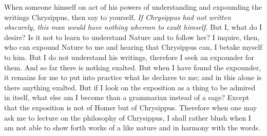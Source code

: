 When someone himself  on act of his powers of  understanding and expounding the
writings Chrysippus, then say to  yourself, \emph{If Chrysippus had not written
obscurely, this man  would have nothing whereon to exalt  himself.} But I, what
do I  desire? Is  it not to  learn to  understand Nature and  to follow  her? I
inquire, then, who can expound Nature to  me and hearing that Chrysippus can, I
betake myself to him. But I do not understand his writings, therefore I seek an
expounder for them. And so far there  is nothing exalted. But when I have found
the expounder, it remains  for me to put into practice what  he declares to me;
and in this alone is there anything exalted. But if I look on the exposition as
a  thing to  be admired  in itself,  what else  am I  become than  a grammarian
instead  of  a  sage? Except  that  the  exposition  is  not of  Homer  but  of
Chrysippus.  Therefore when  one may  ask me  to lecture  on the  philosophy of
Chrysippus, I shall  rather blush when I am  not able to show forth  works of a
like nature and in harmony with the words.

